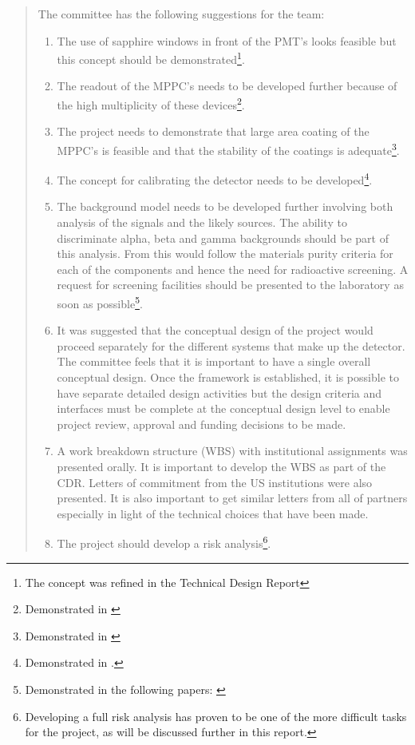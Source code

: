 \begin{quotation}
The committee has the following suggestions for the team:
 \begin{enumerate}
\item The use of sapphire windows in front of the PMT’s looks feasible but this concept should be demonstrated\footnote{The concept was refined in the Technical Design Report\cite{Alvarez:2012flf}}.
\item The readout of the MPPC’s needs to be developed further because of the high multiplicity of these devices\footnote{Demonstrated in \cite{Abazajian:2012ys}}.
\item The project needs to demonstrate that large area coating of the MPPC’s is feasible and that the stability of the coatings is adequate\footnote{Demonstrated in \cite{Alvarez:2012ub}}.
\item The concept for calibrating the detector needs to be developed\footnote{Demonstrated
in \cite{Alvarez:2012haa}.}.
\item The background model needs to be developed further involving both analysis of the signals and the likely sources. The ability to discriminate alpha, beta and gamma backgrounds should be part of this analysis. From this would follow the materials purity criteria for each of the components and hence the need for radioactive screening. A request for screening facilities should be presented to the laboratory as soon as possible\footnote{Demonstrated
in the following papers: \cite{Alvarez:2012as,Alvarez:2013wxj,Dafni:2014yja,Alvarez:2014kvs,Cebrian:2015jna}}.
\item It was suggested that the conceptual design of the project would proceed separately for the different systems that make up the detector. The committee feels that it is important to have a single overall conceptual design. Once the framework is established, it is possible to have separate detailed design activities but the design criteria and interfaces must be complete at the conceptual design level to enable project review, approval and funding decisions to be made.
\item A work breakdown structure (WBS) with institutional assignments was presented orally. It is important to develop the WBS as part of the CDR. Letters of commitment from the US institutions were also presented. It is also important to get similar letters from all of partners especially in light of the technical choices that have been made.
\item The project should develop a risk analysis\footnote{Developing a full risk analysis has proven to be one of the more difficult tasks for the project, as will be discussed further in this report.}. 

\end{enumerate}
\end{quotation}
